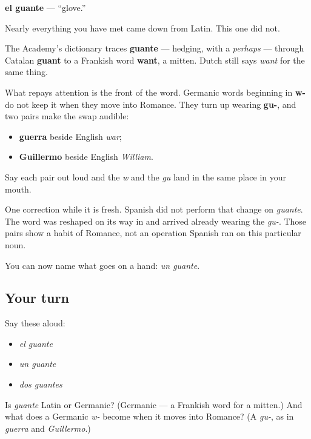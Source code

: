 \begin{cousinweb}
\textbf{el guante} — \textquotedblleft{}glove.\textquotedblright{}

Nearly everything you have met came down from Latin. This one did not.

The Academy's dictionary traces \textbf{guante} — hedging, with a \emph{perhaps} — through Catalan \textbf{guant} to a Frankish word \textbf{want}, a mitten. Dutch still says \emph{want} for the same thing.

What repays attention is the front of the word. Germanic words beginning in \textbf{w-} do not keep it when they move into Romance. They turn up wearing \textbf{gu-}, and two pairs make the swap audible:

\begin{itemize}
\raggedright
  \item \textbf{guerra} beside English \emph{war};
  \item \textbf{Guillermo} beside English \emph{William}.
\end{itemize}

Say each pair out loud and the \emph{w} and the \emph{gu} land in the same place in your mouth.

One correction while it is fresh. Spanish did not perform that change on \emph{guante}. The word was reshaped on its way in and arrived already wearing the \emph{gu-}. Those pairs show a habit of Romance, not an operation Spanish ran on this particular noun.
\end{cousinweb}

\begin{grammarlens}[title={What you've built}]
You can now name what goes on a hand: \emph{un guante}.
\end{grammarlens}

\subsection*{Your turn}
Say these aloud:

\begin{itemize}
\raggedright
  \item \emph{el guante}
  \item \emph{un guante}
  \item \emph{dos guantes}
\end{itemize}

\begin{tcolorbox}[breakable,colback=teal!4,colframe=teal!35!black,title={Before you move on}]
Is \emph{guante} Latin or Germanic? (Germanic — a Frankish word for a mitten.) And what does a Germanic \emph{w-} become when it moves into Romance? (A \emph{gu-}, as in \emph{guerra} and \emph{Guillermo}.)
\end{tcolorbox}
